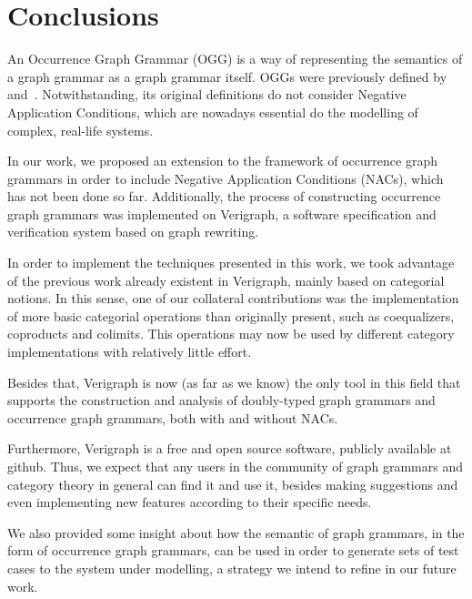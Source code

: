 \chapter{Conclusions}\label{ch:conclusions}

An Occurrence Graph Grammar (OGG) is a way of representing the semantics of a graph grammar as a graph grammar itself. OGGs were previously defined by~\cite{Ribeiro1996} and~\cite{Corradini1996}. Notwithstanding, its original definitions do not consider Negative Application Conditions, which are nowadays essential do the modelling of complex, real-life systems.

  In our work, we proposed an extension to the framework of occurrence graph grammars in order to include Negative Application Conditions (NACs), which has not been done so far. Additionally, the process of constructing occurrence graph grammars was implemented on Verigraph, a software specification and verification system based on graph rewriting.%


In order to implement the techniques presented in this work, we took advantage of the previous work already existent in Verigraph, mainly based on categorial notions. In this sense, one of our collateral contributions was the implementation of more basic categorial operations than originally present, such as coequalizers, coproducts and colimits. This operations may now be used by different category implementations with relatively little effort. 

Besides that, Verigraph is now (as far as we know) the only tool in this field that supports the construction and analysis of doubly-typed graph grammars and occurrence graph grammars, both with and without NACs.

    Furthermore, Verigraph is a free and open source software, publicly available at github. Thus, we expect that any users in the community of graph grammars and category theory in general can find it and use it, besides making suggestions and even implementing new features according to their specific needs.

We also provided some insight about how the semantic of graph grammars, in the form of occurrence graph grammars, can be used in order to generate sets of test cases to the system under modelling, a strategy we intend to refine in our future work.

